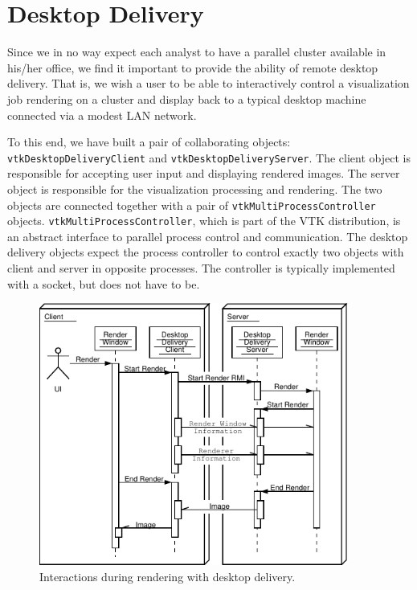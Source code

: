 \documentclass{acmsiggraph}
\newcommand{\cidentifier}[1]{\texttt{#1}}
\begin{document}
  \section{Desktop Delivery}
  \label{sec:desktop_delivery}

  Since we in no way expect each analyst to have a parallel cluster
  available in his/her office, we find it important to provide the ability
  of remote desktop delivery.  That is, we wish a user to be able to
  interactively control a visualization job rendering on a cluster and
  display back to a typical desktop machine connected via a modest LAN
  network.

  To this end, we have built a pair of collaborating objects:
  \cidentifier{vtk\-Desktop\-Delivery\-Client} and
  \cidentifier{vtk\-Desktop\-Delivery\-Server}.  The client object is
  responsible for accepting user input and displaying rendered images.  The
  server object is responsible for the visualization processing and
  rendering.  The two objects are connected together with a pair of
  \cidentifier{vtk\-Multi\-Process\-Controller} objects.
  \cidentifier{vtk\-Multi\-Process\-Controller}, which is part of the VTK
  distribution, is an abstract interface to parallel process control and
  communication.  The desktop delivery objects expect the process
  controller to control exactly two objects with client and server in
  opposite processes.  The controller is typically implemented with a
  socket, but does not have to be.

  \begin{figure}[ht]
    \begin{center}
      \includegraphics[width=4in]{images/DesktopDeliveryInteraction}
      \caption{Interactions during rendering with desktop delivery.}
      \label{fig:desktop_delivery_interaction}
    \end{center}
  \end{figure}
\end{document}
